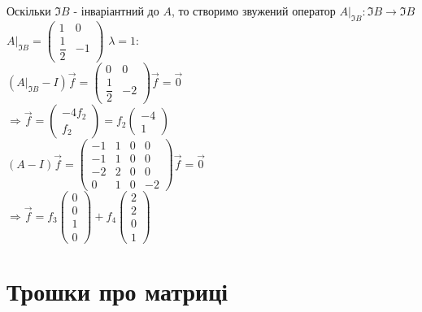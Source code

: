 \documentclass[a4paper, 14pt]{extarticle}
\begin{document}
Оскільки $\Im B$ - інваріантний до $A$, то створимо звужений оператор $A|_{\Im B}: \Im B \to \Im B$\\
$A|_{\Im B} = \begin{pmatrix}
1 & 0 \\
\dfrac{1}{2} & -1
\end{pmatrix}$
$\lambda = 1:$\\
$(A|_{\Im B} - I)\vec{f} = \begin{pmatrix}
0 & 0 \\
\dfrac{1}{2} & -2
\end{pmatrix} \vec{f} = \vec{0}$\\
$\Rightarrow \vec{f} = \begin{pmatrix}
-4f_2 \\ f_2
\end{pmatrix} = f_2 \begin{pmatrix}
-4 \\ 1
\end{pmatrix}$\\
$(A-I)\vec{f} = \begin{pmatrix}
-1 & 1 & 0 & 0 \\
-1 & 1 & 0 & 0 \\
-2 & 2 & 0 & 0 \\
0 & 1 & 0 & -2
\end{pmatrix} \vec{f} = \vec{0}$\\
$\Rightarrow \vec{f} = f_3 \begin{pmatrix}
0 \\ 0 \\ 1 \\ 0
\end{pmatrix} + f_4 \begin{pmatrix}
2 \\ 2 \\ 0 \\ 1
\end{pmatrix}$

\section{Трошки про матриці}
\end{document}
